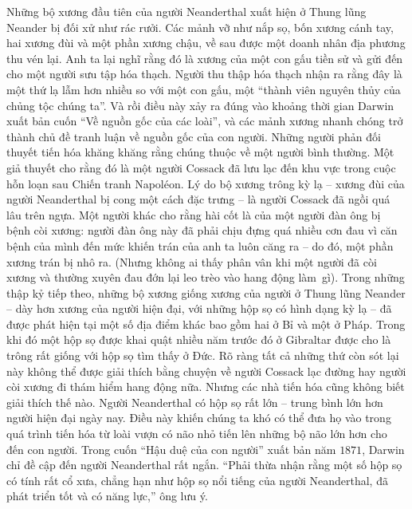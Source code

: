 \begin{multicols}{2}
	\vskip 0.1cm
	Những bộ xương đầu tiên của người Neanderthal xuất hiện ở Thung lũng Neander bị đối xử như rác rưởi. Các mảnh vỡ như nắp sọ, bốn xương cánh tay, hai xương đùi và một phần xương chậu, về sau được một doanh nhân địa phương thu vén lại. Anh ta lại nghĩ rằng đó là xương của một con gấu tiền sử và gửi đến cho một người sưu tập hóa thạch. Người thu thập hóa thạch nhận ra rằng đây là một thứ lạ lẫm hơn nhiều so với một con gấu, một “thành viên nguyên thủy của chủng tộc chúng ta”.
	\vskip 0.1cm
	\vskip 0.1cm
	Và rồi điều này xảy ra đúng vào khoảng thời gian Darwin xuất bản cuốn “Về nguồn gốc của các loài”, và các mảnh xương nhanh chóng trở thành chủ đề tranh luận về nguồn gốc của con người. Những người phản đối thuyết tiến hóa khăng khăng rằng chúng thuộc về một người bình thường. Một giả thuyết cho rằng đó là một người Cossack đã lưu lạc đến khu vực trong cuộc hỗn loạn sau Chiến tranh Napoléon. Lý do bộ xương trông kỳ lạ -- xương đùi của người Neanderthal bị cong một cách đặc trưng -- là người Cossack đã ngồi quá lâu trên ngựa. Một người khác cho rằng hài cốt là của một người đàn ông bị bệnh còi xương: người đàn ông này đã phải chịu đựng quá nhiều cơn đau vì căn bệnh của mình đến mức khiến trán của anh ta luôn căng ra -- do đó, một phần xương trán bị nhô ra. (Nhưng không ai thấy phân vân khi một người đã còi xương và thường xuyên đau đớn lại leo trèo vào hang động làm~gì).
	\vskip 0.1cm
	Trong những thập kỷ tiếp theo, những bộ xương giống xương của người ở Thung lũng Neander -- dày hơn xương của người hiện đại, với những hộp sọ có hình dạng kỳ lạ -- đã được phát hiện tại một số địa điểm khác bao gồm hai ở Bỉ và một ở Pháp. Trong khi đó một hộp sọ được khai quật nhiều năm trước đó ở Gibraltar được cho là trông rất giống với hộp sọ tìm thấy ở Đức. Rõ ràng tất cả những thứ còn sót lại này không thể được giải thích bằng chuyện về người Cossack lạc đường hay người còi xương đi thám hiểm hang động nữa. Nhưng các nhà tiến hóa cũng không biết giải thích thế nào. Người Neanderthal có hộp sọ rất lớn -- trung bình lớn hơn người hiện đại ngày nay. Điều này khiến chúng ta khó có thể đưa họ vào trong quá trình tiến hóa từ loài vượn có não nhỏ tiến lên những bộ não lớn hơn cho đến con người. Trong cuốn “Hậu duệ của con người” xuất bản năm $1871$, Darwin chỉ đề cập đến người Neanderthal rất ngắn. “Phải thừa nhận rằng một số hộp sọ có tính rất cổ xưa, chẳng hạn như hộp sọ nổi tiếng của người Neanderthal, đã phát triển tốt và có năng lực,” ông lưu ý.

\end{multicols}
